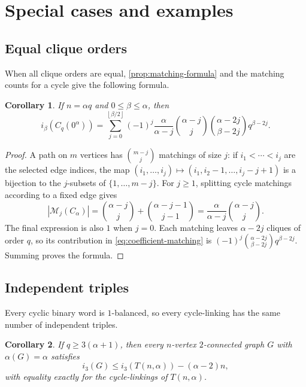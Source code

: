 \documentclass[11pt]{article}
\newtheorem{corollary}[corollary]{Corollary}
\theoremstyle{definition}
\newcommand{\cM}{\mathcal{M}}
\newcommand{\floor}[1]{\left\lfloor #1\right\rfloor}
\begin{document}
\section{Special cases and examples}
\label{sec:examples}

\subsection{Equal clique orders}

When all clique orders are equal, \cref{prop:matching-formula} and the
matching counts for a cycle give the following formula.

\begin{corollary}\label{cor:divisible-value}
If $n=\alpha q$ and $0\le\beta\le\alpha$, then
\begin{equation}\label{eq:divisible-value}
 i_\beta(C_q(0^\alpha))
 =\sum_{j=0}^{\floor{\beta/2}}(-1)^j
   \frac{\alpha}{\alpha-j}\binom{\alpha-j}{j}
   \binom{\alpha-2j}{\beta-2j}q^{\beta-2j}.
\end{equation}
\end{corollary}

\begin{proof}
A path on $m$ vertices has $\binom{m-j}{j}$ matchings of size $j$:
if $i_1<\cdots<i_j$ are the selected edge indices, the map
$(i_1,\ldots,i_j)\mapsto(i_1,i_2-1,\ldots,i_j-j+1)$ is a bijection
to the $j$-subsets of $\{1,\ldots,m-j\}$. For $j\ge1$, splitting
cycle matchings according to a fixed edge gives
\[
 |\cM_j(C_\alpha)|
 =\binom{\alpha-j}{j}+\binom{\alpha-j-1}{j-1}
 =\frac{\alpha}{\alpha-j}\binom{\alpha-j}{j}.
\]
The final expression is also $1$ when $j=0$. Each matching leaves
$\alpha-2j$ cliques of order $q$, so its contribution in
\eqref{eq:coefficient-matching} is
$(-1)^j\binom{\alpha-2j}{\beta-2j}q^{\beta-2j}$. Summing proves
the formula.
\end{proof}


\subsection{Independent triples}

Every cyclic binary word is $1$-balanced, so every cycle-linking has
the same number of independent triples.


\begin{corollary}\label{cor:beta3}
If $q\ge3(\alpha+1)$, then every $n$-vertex $2$-connected graph $G$
with $\alpha(G)=\alpha$ satisfies
\[
 i_3(G)\le i_3(T(n,\alpha))-(\alpha-2)n,
\]
with equality exactly for the cycle-linkings of $T(n,\alpha)$.
\end{corollary}
\end{document}
